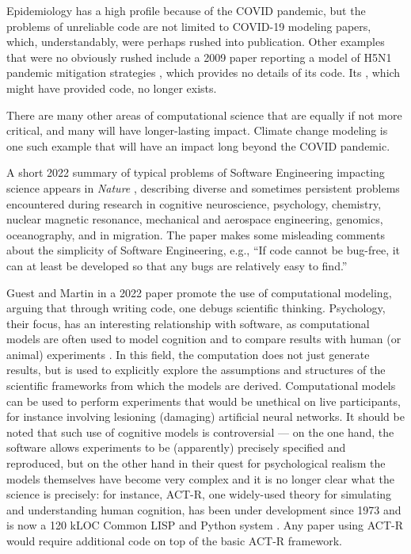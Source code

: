 \documentclass{comjnl}
\begin{document}
Epidemiology has a high profile because of the COVID pandemic, but the problems of unreliable code are not limited to COVID-19 modeling papers, which, understandably, were perhaps rushed into publication. Other examples that were no obviously rushed include a 2009 paper reporting a model of H5N1 pandemic mitigation strategies \cite{flu-model}, which provides no details of its code. Its \supplement, which might have provided code, no longer exists.

There are many other areas of computational science that are equally if not more critical, and many will have longer-lasting impact. Climate change modeling is one such example that will have an impact long beyond the COVID pandemic.

A short 2022 summary of typical problems of Software Engineering impacting science appears in \emph{Nature\/} \cite{nature-review}, describing diverse and sometimes persistent problems encountered during research in cognitive neuroscience, psychology, chemistry, nuclear magnetic resonance, mechanical and aerospace engineering, genomics, oceanography, and in migration. The paper \cite{nature-review}  makes some misleading comments about the simplicity of Software Engineering, e.g., ``If code cannot be bug-free, it can at least be developed so that any bugs are relatively easy to find.''

Guest and Martin in a 2022 paper \cite{psychological-modeling} promote the use of computational modeling, arguing that through writing code, one debugs scientific thinking. Psychology, their focus, has an interesting relationship with software, as computational models are often used to model cognition and to compare results with human (or animal) experiments \cite{psychological-modeling}. In this field, the computation does not just generate results, but is used to explicitly explore the assumptions and structures of the scientific frameworks from which the models are derived. Computational models can be used to perform experiments that would be unethical on live participants, for instance involving lesioning (damaging) artificial neural networks. It should be noted that such use of cognitive models is controversial --- on the one hand, the software allows experiments to be (apparently) precisely specified and reproduced, but on the other hand in their quest for psychological realism the models themselves have become very complex and it is no longer clear what the science is precisely: for instance, ACT-R, one widely-used theory for simulating and understanding human cognition, has been under development since 1973 and is now a 120 kLOC Common LISP and Python system \cite{actr}. Any paper using ACT-R would require additional code on top of the basic ACT-R framework.
\end{document}
